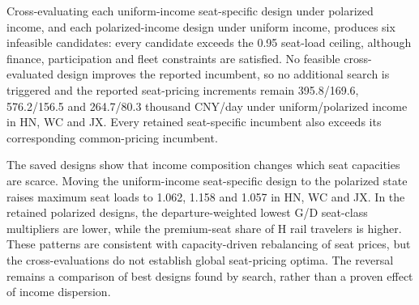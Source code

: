 Cross-evaluating each uniform-income seat-specific design under polarized income, and each polarized-income design under uniform income, produces six infeasible candidates: every candidate exceeds the 0.95 seat-load ceiling, although finance, participation and fleet constraints are satisfied. No feasible cross-evaluated design improves the reported incumbent, so no additional search is triggered and the reported seat-pricing increments remain 395.8/169.6, 576.2/156.5 and 264.7/80.3 thousand CNY/day under uniform/polarized income in HN, WC and JX. Every retained seat-specific incumbent also exceeds its corresponding common-pricing incumbent.

The saved designs show that income composition changes which seat capacities are scarce. Moving the uniform-income seat-specific design to the polarized state raises maximum seat loads to 1.062, 1.158 and 1.057 in HN, WC and JX. In the retained polarized designs, the departure-weighted lowest G/D seat-class multipliers are lower, while the premium-seat share of H rail travelers is higher. These patterns are consistent with capacity-driven rebalancing of seat prices, but the cross-evaluations do not establish global seat-pricing optima. The reversal remains a comparison of best designs found by search, rather than a proven effect of income dispersion.
